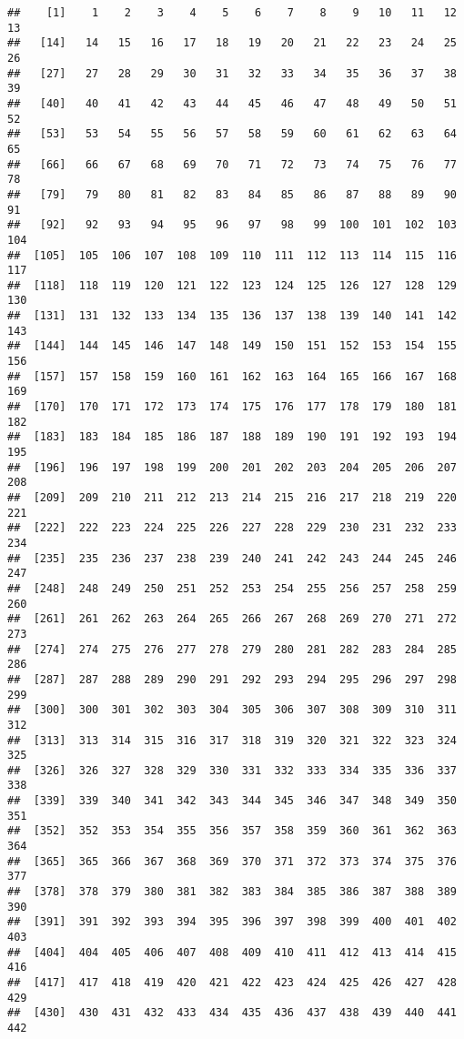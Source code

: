 \documentclass[]{article}
\begin{document}
\begin{verbatim}
##    [1]    1    2    3    4    5    6    7    8    9   10   11   12   13
##   [14]   14   15   16   17   18   19   20   21   22   23   24   25   26
##   [27]   27   28   29   30   31   32   33   34   35   36   37   38   39
##   [40]   40   41   42   43   44   45   46   47   48   49   50   51   52
##   [53]   53   54   55   56   57   58   59   60   61   62   63   64   65
##   [66]   66   67   68   69   70   71   72   73   74   75   76   77   78
##   [79]   79   80   81   82   83   84   85   86   87   88   89   90   91
##   [92]   92   93   94   95   96   97   98   99  100  101  102  103  104
##  [105]  105  106  107  108  109  110  111  112  113  114  115  116  117
##  [118]  118  119  120  121  122  123  124  125  126  127  128  129  130
##  [131]  131  132  133  134  135  136  137  138  139  140  141  142  143
##  [144]  144  145  146  147  148  149  150  151  152  153  154  155  156
##  [157]  157  158  159  160  161  162  163  164  165  166  167  168  169
##  [170]  170  171  172  173  174  175  176  177  178  179  180  181  182
##  [183]  183  184  185  186  187  188  189  190  191  192  193  194  195
##  [196]  196  197  198  199  200  201  202  203  204  205  206  207  208
##  [209]  209  210  211  212  213  214  215  216  217  218  219  220  221
##  [222]  222  223  224  225  226  227  228  229  230  231  232  233  234
##  [235]  235  236  237  238  239  240  241  242  243  244  245  246  247
##  [248]  248  249  250  251  252  253  254  255  256  257  258  259  260
##  [261]  261  262  263  264  265  266  267  268  269  270  271  272  273
##  [274]  274  275  276  277  278  279  280  281  282  283  284  285  286
##  [287]  287  288  289  290  291  292  293  294  295  296  297  298  299
##  [300]  300  301  302  303  304  305  306  307  308  309  310  311  312
##  [313]  313  314  315  316  317  318  319  320  321  322  323  324  325
##  [326]  326  327  328  329  330  331  332  333  334  335  336  337  338
##  [339]  339  340  341  342  343  344  345  346  347  348  349  350  351
##  [352]  352  353  354  355  356  357  358  359  360  361  362  363  364
##  [365]  365  366  367  368  369  370  371  372  373  374  375  376  377
##  [378]  378  379  380  381  382  383  384  385  386  387  388  389  390
##  [391]  391  392  393  394  395  396  397  398  399  400  401  402  403
##  [404]  404  405  406  407  408  409  410  411  412  413  414  415  416
##  [417]  417  418  419  420  421  422  423  424  425  426  427  428  429
##  [430]  430  431  432  433  434  435  436  437  438  439  440  441  442

\end{verbatim}
\end{document}
